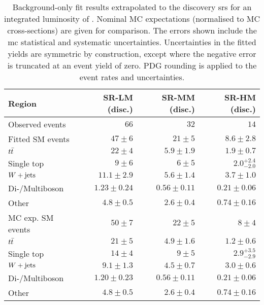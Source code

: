 

\begin{table}
\begin{center}
{\small
\begin{tabular}{lrrr}
\toprule
Region           & SR-LM (disc.)           & SR-MM (disc.)           & SR-HM  (disc.)            \\
\midrule
Observed events          & $66$              & $32$              & $14$                    \\
\midrule
Fitted SM events         & $47 \pm 6$          & $21 \pm 5$          & $8.6 \pm 2.8$              \\
\midrule
        $t\bar{t}$         & $22 \pm 4$          & $5.9 \pm 1.9$          & $1.9 \pm 0.7$              \\
        Single top         & $9 \pm 6$          & $6 \pm 5$          & $2.0_{-2.0}^{+2.4}$              \\
        $W+\mathrm{jets}$         & $11.1 \pm 2.9$          & $5.6 \pm 1.4$          & $3.7 \pm 1.0$              \\
        Di-/Multiboson         & $1.23 \pm 0.24$          & $0.56 \pm 0.11$          & $0.21 \pm 0.06$              \\
        Other         & $4.8 \pm 0.5$          & $2.6 \pm 0.4$          & $0.74 \pm 0.16$              \\
\toprule
MC exp. SM events              & $50 \pm 7$          & $22 \pm 5$          & $8 \pm 4$              \\
\midrule
        $t\bar{t}$         & $21 \pm 5$          & $4.9 \pm 1.6$          & $1.2 \pm 0.6$              \\
        Single top         & $14 \pm 4$          & $9 \pm 5$          & $2.9_{-2.9}^{+3.5}$              \\
        $W+\mathrm{jets}$         & $9.1 \pm 1.3$          & $4.5 \pm 0.7$          & $3.0 \pm 0.6$              \\
        Di-/Multiboson         & $1.20 \pm 0.23$          & $0.56 \pm 0.11$          & $0.21 \pm 0.06$              \\
        Other        & $4.8 \pm 0.5$          & $2.6 \pm 0.4$          & $0.74 \pm 0.16$              \\
\bottomrule
\end{tabular}
}
\end{center}
\caption{ Background-only fit results extrapolated to the discovery \glspl{sr} for an integrated luminosity of \onethirtynineifb. Nominal MC expectations (normalised to MC cross-sections) are given for comparison. The errors shown include the \gls{mc} statistical and systematic uncertainties. Uncertainties in the fitted yields are symmetric by construction, except where the negative error is truncated at an event yield of zero. PDG rounding is applied to the event rates and uncertainties.}
\label{tab:results_bkg_only_SR_disc}
\end{table}
%